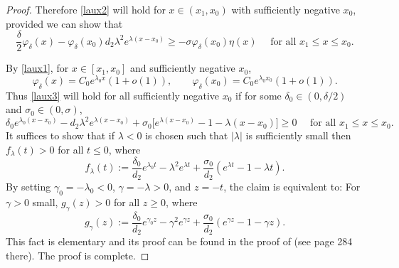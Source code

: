 \documentclass[reqno]{amsart}
\theoremstyle{plain}
\theoremstyle{definition}
\theoremstyle{remark}
\begin{document}
\begin{proof}
		Therefore \eqref{laux2} will hold for $x\in(x_1,x_0)$ with sufficiently negative $x_0$, provided we can show that
		\begin{equation}\label{laux3}
			\frac{\delta}{2}\varphi_{\delta}(x) - \varphi_{\delta}(x_0) d_2 \lambda^2 e^{\lambda(x-x_0)}
			\ge -\sigma\varphi_{\delta}(x_0)\eta(x) \quad \text{ for all } x_1 \le x \le x_0.
		\end{equation}
		
		By \eqref{laux1}, for $x\in[x_1,x_0]$ and sufficiently negative $x_0$,
		\[
		\varphi_{\delta}(x) = C_0 e^{\lambda_0x}(1+o(1)),\qquad
		\varphi_{\delta}(x_0) = C_0 e^{\lambda_0x_0}(1+o(1)).
		\]
		Thus \eqref{laux3} will hold for all sufficiently negative $x_0$ if for some $\delta_0\in(0,\delta/2)$ and $\sigma_0\in(0,\sigma)$,
		\[
		\delta_0 e^{\lambda_0(x-x_0)} - d_2 \lambda^2 e^{\lambda(x-x_0)}
		+ \sigma_0\bigl[e^{\lambda(x-x_0)} - 1 - \lambda(x-x_0)\bigr] \ge 0 \quad \text{ for all } x_1 \le x \le x_0.
		\]
		It suffices to show that if $\lambda<0$ is chosen such that $|\lambda|$ is sufficiently small then  $f_{\lambda}(t)>0$ for all $t\le0$, where
		\[
		f_{\lambda}(t):=\frac{\delta_0}{d_2} e^{\lambda_0 t} - \lambda^2 e^{\lambda t} + \frac{\sigma_0}{d_2} (e^{\lambda t} - 1 - \lambda t).
		\]
		By setting $\gamma_0 = -\lambda_0 < 0$, $\gamma = -\lambda > 0$, and $z=-t$, the claim is equivalent to: For $\gamma>0$ small, $g_{\gamma}(z)>0$ for all $z\ge0$, where
		\[
		g_{\gamma}(z):=\frac{\delta_0}{d_2} e^{\gamma_0 z} - \gamma^2 e^{\gamma z} + \frac{\sigma_0}{d_2} (e^{\gamma z} - 1 - \gamma z).
		\]
		This fact is elementary and its proof can be found in the proof of \cite[Lemma 3.3]{MR3609207} (see page 284 there).		
		The proof is complete.
	\end{proof}
	
\end{document}
